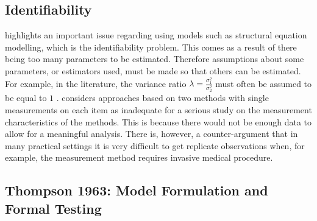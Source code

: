 \documentclass[12pt, a4paper]{report}
\theoremstyle{plain}
\theoremstyle{definition}
\theoremstyle{remark}
\begin{document}
	
	\subsection{Identifiability}
	\citet{DunnSEME} highlights an important issue regarding using models such as structural equation modelling, which is the identifiability problem. This comes as a
	result of there being too many parameters to be estimated. Therefore assumptions about some parameters, or estimators used, must be made so that others can be estimated. For example, in the literature, the variance ratio $\lambda=\frac{\sigma^{2}_{1}}{\sigma^{2}_{2}}$
	must often be assumed to be equal to $1$ \citep{linnet98}. \citet{DunnSEME} considers approaches based on two methods with single measurements on each item as inadequate for a serious
	study on the measurement characteristics of the methods. This is because there would not be enough data to allow for a meaningful
	analysis. There is, however, a counter-argument that in many practical settings it is very difficult to get replicate observations when, for example, the measurement method requires invasive medical
	procedure.
	
	
	
	
	
	
	
	
	
	
	
	
	
	
	
	
	
	
	\subsection{Thompson 1963: Model Formulation and Formal Testing}
	
\end{document}
